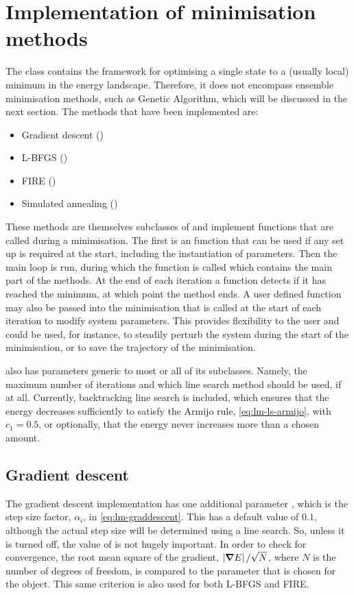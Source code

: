 \section{Implementation of minimisation methods}
The  class contains the framework for optimising a single state to a (usually local) minimum in the energy landscape.
Therefore, it does not encompass ensemble minimisation methods, such as Genetic Algorithm, which will be discussed in the next section.
The methods that have been implemented are:
\begin{itemize}
  \item Gradient descent ()
  \item L-BFGS ()
  \item FIRE ()
  \item Simulated annealing ()
\end{itemize}


These methods are themselves subclasses of  and implement functions that are called during a minimisation.
The first is an  function that can be used if any set up is required at the start, including the instantiation of parameters.
Then the main loop is run, during which the  function is called which contains the main part of the methods.
At the end of each iteration a  function detects if it has reached the minimum, at which point the method ends.
A user defined function may also be passed into the minimisation that is called at the start of each iteration to modify system parameters.
This provides flexibility to the user and could be used, for instance, to steadily perturb the system during the start of the minimisation, or to save the trajectory of the minimisation.

 also has parameters generic to most or all of its subclasses.
Namely, the maximum number of iterations and which line search method should be used, if at all.
Currently, backtracking line search is included, which ensures that the energy decreases sufficiently to satisfy the Armijo rule, \cref{eq:lm-ls-armijo}, with $c_1=0.5$, or optionally, that the energy never increases more than a chosen amount.

\subsection{Gradient descent}
The gradient descent implementation has one additional parameter , which is the step size factor, $\alpha_i$, in \cref{eq:lm-graddescent}.
This has a default value of $0.1$, although the actual step size will be determined using a line search.
So, unless it is turned off, the value of  is not hugely important.
In order to check for convergence, the root mean square of the gradient, $\left| \bm{\nabla} E \right| / \sqrt{N}$, where $N$ is the number of degrees of freedom, is compared to the  parameter that is chosen for the  object.
This same criterion is also used for both L-BFGS and FIRE.

